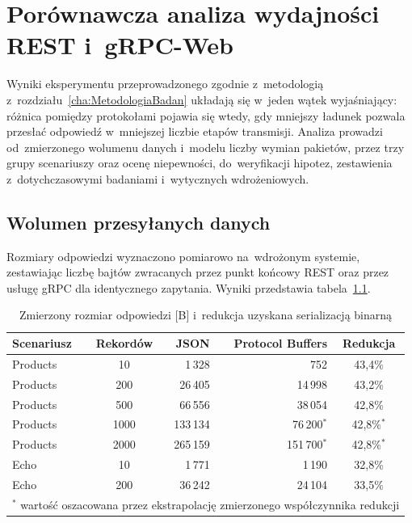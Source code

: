 \cleardoublepage

\chapter{Porównawcza analiza wydajności REST i~gRPC-Web}
\label{cha:AnalizaWydajnosci}

Wyniki eksperymentu przeprowadzonego zgodnie z~metodologią z~rozdziału~\ref{cha:MetodologiaBadan} układają się w~jeden wątek wyjaśniający: różnica pomiędzy protokołami pojawia się wtedy, gdy mniejszy ładunek pozwala przesłać odpowiedź w~mniejszej liczbie etapów transmisji. Analiza prowadzi od~zmierzonego wolumenu danych i~modelu liczby wymian pakietów, przez trzy grupy scenariuszy oraz ocenę niepewności, do~weryfikacji hipotez, zestawienia z~dotychczasowymi badaniami i~wytycznych wdrożeniowych.

\section{Wolumen przesyłanych danych}
\label{sec:WolumenDanych}

Rozmiary odpowiedzi wyznaczono pomiarowo na~wdrożonym systemie, zestawiając liczbę bajtów zwracanych przez punkt końcowy REST oraz przez usługę gRPC dla identycznego zapytania. Wyniki przedstawia tabela~\ref{tab:WolumenDanych}.

\begin{table}[htb]
\centering
\footnotesize
\caption{Zmierzony rozmiar odpowiedzi [B] i~redukcja uzyskana serializacją binarną}
\label{tab:WolumenDanych}
\begin{tabular}{|l|c|r|r|c|}
\hline
\textbf{Scenariusz} & \textbf{Rekordów} & \textbf{JSON} & \textbf{Protocol Buffers} & \textbf{Redukcja} \\
\hline
Products & 10   & 1\,328   & 752      & 43,4\% \\
Products & 200  & 26\,405  & 14\,998  & 43,2\% \\
Products & 500  & 66\,556  & 38\,054  & 42,8\% \\
Products & 1000 & 133\,134 & 76\,200$^{*}$  & 42,8\%$^{*}$ \\
Products & 2000 & 265\,159 & 151\,700$^{*}$ & 42,8\%$^{*}$ \\
\hline
Echo     & 10   & 1\,771   & 1\,190   & 32,8\% \\
Echo     & 200  & 36\,242  & 24\,104  & 33,5\% \\
\hline
\multicolumn{5}{|l|}{\footnotesize $^{*}$ wartość oszacowana przez ekstrapolację zmierzonego współczynnika redukcji} \\
\hline
\end{tabular}
\end{table}

